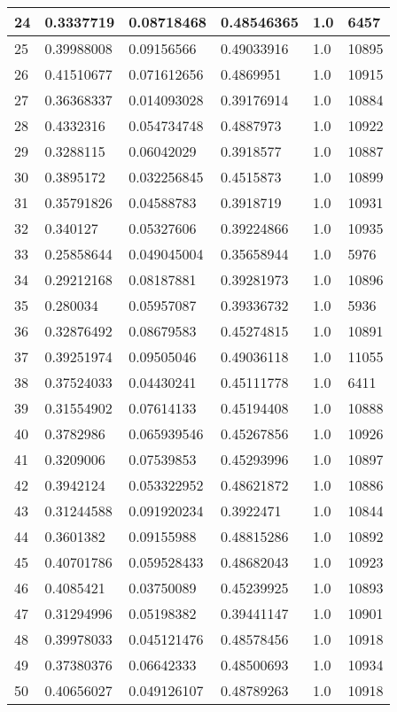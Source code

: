 \begin{longtable}{|l|l|l|l|l|l|}
24 & 0.3337719 & 0.08718468 & 0.48546365 & 1.0 & 6457 \\ \hline 
25 & 0.39988008 & 0.09156566 & 0.49033916 & 1.0 & 10895 \\ \hline 
26 & 0.41510677 & 0.071612656 & 0.4869951 & 1.0 & 10915 \\ \hline 
27 & 0.36368337 & 0.014093028 & 0.39176914 & 1.0 & 10884 \\ \hline 
28 & 0.4332316 & 0.054734748 & 0.4887973 & 1.0 & 10922 \\ \hline 
29 & 0.3288115 & 0.06042029 & 0.3918577 & 1.0 & 10887 \\ \hline 
30 & 0.3895172 & 0.032256845 & 0.4515873 & 1.0 & 10899 \\ \hline 
31 & 0.35791826 & 0.04588783 & 0.3918719 & 1.0 & 10931 \\ \hline 
32 & 0.340127 & 0.05327606 & 0.39224866 & 1.0 & 10935 \\ \hline 
33 & 0.25858644 & 0.049045004 & 0.35658944 & 1.0 & 5976 \\ \hline 
34 & 0.29212168 & 0.08187881 & 0.39281973 & 1.0 & 10896 \\ \hline 
35 & 0.280034 & 0.05957087 & 0.39336732 & 1.0 & 5936 \\ \hline 
36 & 0.32876492 & 0.08679583 & 0.45274815 & 1.0 & 10891 \\ \hline 
37 & 0.39251974 & 0.09505046 & 0.49036118 & 1.0 & 11055 \\ \hline 
38 & 0.37524033 & 0.04430241 & 0.45111778 & 1.0 & 6411 \\ \hline 
39 & 0.31554902 & 0.07614133 & 0.45194408 & 1.0 & 10888 \\ \hline 
40 & 0.3782986 & 0.065939546 & 0.45267856 & 1.0 & 10926 \\ \hline 
41 & 0.3209006 & 0.07539853 & 0.45293996 & 1.0 & 10897 \\ \hline 
42 & 0.3942124 & 0.053322952 & 0.48621872 & 1.0 & 10886 \\ \hline 
43 & 0.31244588 & 0.091920234 & 0.3922471 & 1.0 & 10844 \\ \hline 
44 & 0.3601382 & 0.09155988 & 0.48815286 & 1.0 & 10892 \\ \hline 
45 & 0.40701786 & 0.059528433 & 0.48682043 & 1.0 & 10923 \\ \hline 
46 & 0.4085421 & 0.03750089 & 0.45239925 & 1.0 & 10893 \\ \hline 
47 & 0.31294996 & 0.05198382 & 0.39441147 & 1.0 & 10901 \\ \hline 
48 & 0.39978033 & 0.045121476 & 0.48578456 & 1.0 & 10918 \\ \hline 
49 & 0.37380376 & 0.06642333 & 0.48500693 & 1.0 & 10934 \\ \hline 
50 & 0.40656027 & 0.049126107 & 0.48789263 & 1.0 & 10918 \\ \hline 
\end{longtable}
